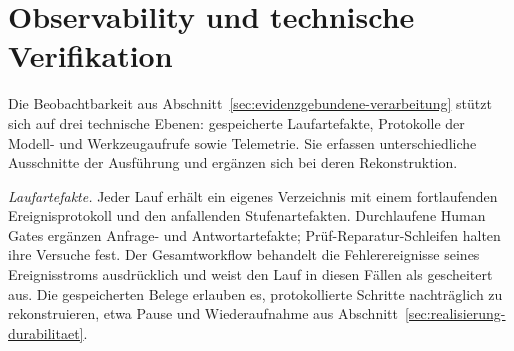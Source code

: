 
\section{Observability und technische Verifikation}
\label{sec:realisierung-observability}

Die Beobachtbarkeit aus
Abschnitt~\ref{sec:evidenzgebundene-verarbeitung} stützt sich auf
drei technische Ebenen: gespeicherte Laufartefakte, Protokolle der
Modell- und Werkzeugaufrufe sowie Telemetrie. Sie erfassen
unterschiedliche Ausschnitte der Ausführung und ergänzen sich bei
deren Rekonstruktion.

\emph{Laufartefakte.} Jeder Lauf erhält ein eigenes Verzeichnis
mit einem fortlaufenden Ereignisprotokoll und den anfallenden
Stufenartefakten. Durchlaufene Human Gates ergänzen Anfrage- und
Antwortartefakte; Prüf-Reparatur-Schleifen halten ihre Versuche
fest. Der Gesamtworkflow behandelt die Fehlerereignisse seines
Ereignisstroms ausdrücklich und weist den Lauf in diesen Fällen
als gescheitert aus. Die gespeicherten Belege erlauben es,
protokollierte Schritte nachträglich zu rekonstruieren, etwa Pause
und Wiederaufnahme aus
Abschnitt~\ref{sec:realisierung-durabilitaet}.

